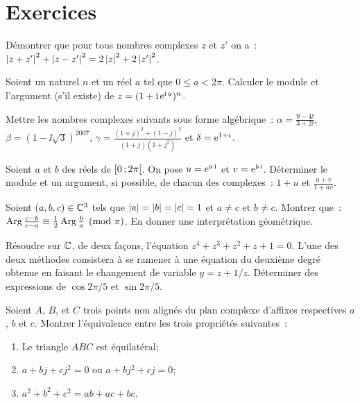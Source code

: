 \section{Exercices}
\begin{exercice}
    Démontrer que pour tous nombres complexes \(z\) et \(z'\) on 
    a~:\(\left\lvert z+z'\right\rvert^2 + \left\lvert z-z'\right\rvert^2 = 2\left\lvert z\right\rvert^2 + 2\left\lvert z'\right\rvert^2\).
\end{exercice}
\begin{exercice}
    Soient un naturel \(n\) et un réel \(a\) tel que \(0 \leqslant a < 2\pi\). 
    Calculer le module et l'argument (s'il existe) de \(z = (1+\operatorname{i}\operatorname{e}^{\operatorname{i} 
    a})^n\).
\end{exercice}
\begin{exercice}
    Mettre les nombres complexes suivants sous forme algébrique~: \(\alpha = 
    \frac{9-4\ii}{3+2\ii}\), \(\beta=(1-\ii\sqrt{3})^{2007}\), \(\gamma = 
    \frac{(1+j)^3+(1-j)^3}{(1+j)(1+j^2)}\) et \( \delta = \operatorname{e}^{1+i}\).
\end{exercice}
\begin{exercice}
    Soient \(a\) et \(b\) des réels de \(\left[ 0 \, ;  2\pi \right[\). On pose 
    \(u=\operatorname{e}^{a\operatorname{i}}\) et \(v=\operatorname{e}^{b\operatorname{i}}\). Déterminer le module et un argument, si 
    possible, de chacun des complexes~: \(1+u\) et \(\frac{u+v}{1+uv}\).
\end{exercice}
\begin{exercice}
    Soient \((a, b, c) \in \mathbb{C}^3\) tels que \(\left\lvert a\right\rvert=\left\lvert b\right\rvert=\left\lvert c\right\rvert=1\) et \(a 
    \neq c\) et \(b \neq c\). Montrer que~:\(\operatorname{Arg} \frac{c-b}{c-a} \equiv 
    \frac{1}{2} \operatorname{Arg} \frac{b}{a} \pmod \pi\). En donner une interprétation 
    géométrique.
\end{exercice}
\begin{exercice}
    Résoudre sur \(\mathbb{C}\), de deux façons, l'équation \(z^4+z^3+z^2+z+1=0\). L'une 
    des deux méthodes consistera à se ramener à une équation du deuxième degré 
    obtenue en faisant le changement de variable \(y = z+1/z\). Déterminer des 
    expressions de \(\cos 2\pi/5\) et \(\sin 2\pi/5\).
\end{exercice}
\begin{exercice}
    Soient \(A\), \(B\), et \(C\) trois points non alignés du plan complexe 
    d'affixes respectives \(a\), \(b\) et \(c\). Montrer l'équivalence entre les 
    trois propriétés suivantes~:
    \begin{enumerate}
        \item Le triangle \(ABC\) est équilatéral;
        \item \(a+bj+cj^2=0\) ou \(a+bj^2+cj=0\);
        \item \(a^2+b^2+c^2=ab+ac+bc\).
    \end{enumerate}
\end{exercice}
